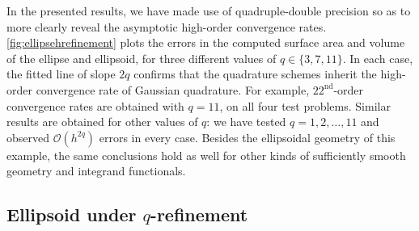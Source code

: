 \documentclass[onefignum,onetabnum,onealgnum,oneeqnum]{siamart190516}
\begin{document}
In the presented results, we have made use of quadruple-double precision so as to more clearly reveal the asymptotic high-order convergence rates. \cref{fig:ellipsehrefinement} plots the errors in the computed surface area and volume of the ellipse and ellipsoid, for three different values of $q \in \{3,7,11\}$. In each case, the fitted line of slope $2q$ confirms that the quadrature schemes inherit the high-order convergence rate of Gaussian quadrature. For example, $22^\text{nd}$-order convergence rates are obtained with $q = 11$, on all four test problems. Similar results are obtained for other values of $q$: we have tested $q = 1, 2, \ldots, 11$ and observed ${\mathcal O}(h^{2q})$ errors in every case. Besides the ellipsoidal geometry of this example, the same conclusions hold as well for other kinds of sufficiently smooth geometry and integrand functionals. %



\subsection{Ellipsoid under \texorpdfstring{$q$}{q}-refinement}
\label{sec:ellipseQ}
\end{document}

